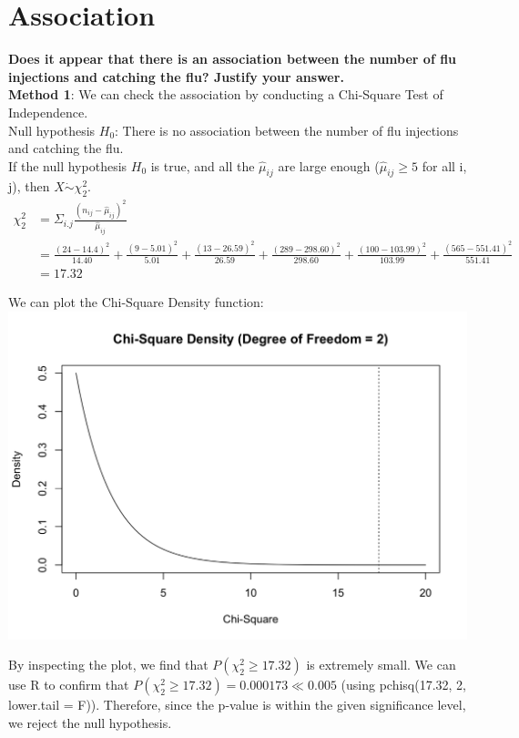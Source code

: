 \documentclass[
]{book}
\begin{document}
\section{Association}\label{association}

\textbf{Does it appear that there is an association between the number of flu injections and catching the flu? Justify your answer.}\\

\textbf{Method 1}: We can check the association by conducting a Chi-Square Test of Independence.\\
Null hypothesis \(H_0\): There is no association between the number of flu injections and catching the flu.\\
If the null hypothesis \(H_0\) is true, and all the \(\hat{\mu}_{ij}\) are large enough (\(\hat{\mu}_{ij} \geq 5\) for all i, j), then \(X \mathrel{\dot\sim} \chi_{2}^{2}\).
\[\begin{aligned}
  \chi_{2}^{2} &= \Sigma_{i.j} \frac{(n_{ij} - \hat{\mu}_{ij})^2}{\hat{\mu}_{ij}} \\
  &= \frac{(24 - 14.4)^2}{14.40} + \frac{(9 - 5.01)^2}{5.01} + \frac{(13-26.59)^2}{26.59} + \frac{(289 - 298.60)^2}{298.60} + \frac{(100 - 103.99)^2}{103.99} + \frac{(565 - 551.41)^2}{551.41} \\
  &= 17.32
\end{aligned}\]

We can plot the Chi-Square Density function:\\
\includegraphics{unnamed-chunk-6-1.png}

By inspecting the plot, we find that \(P(\chi_{2}^{2} \geq 17.32)\) is extremely small. We can use R to confirm that \(P(\chi_{2}^{2} \geq 17.32) = 0.000173 \ll 0.005\) (using pchisq(17.32, 2, lower.tail = F)). Therefore, since the p-value is within the given significance level, we reject the null hypothesis.
\end{document}
